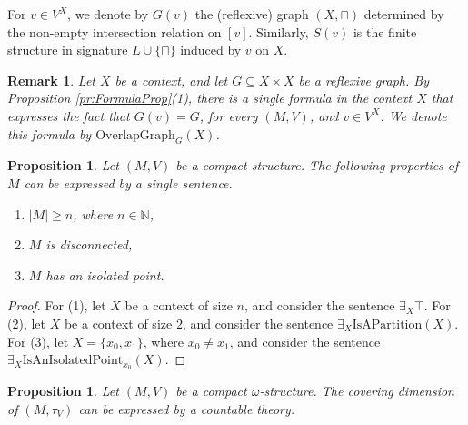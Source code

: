 \documentclass[12pt]{amsart}
\theoremstyle{plain}
\newtheorem{remark}[theorem]{\bf Remark}
\newtheorem{proposition}[theorem]{\bf Proposition}
\newcommand \NN{\mathbb{N}}
\newcommand \PPb{\mathbb{P}}
\DeclareMathOperator{\Cov}{\mathbf{Cov}}
\begin{document}
For $v \in V^X$, we denote by $G(v)$ the (reflexive) graph $(X, \sqcap)$ determined by the non-empty intersection relation on $[v]$. Similarly, $S(v)$ is the finite structure in signature $L \cup \{\sqcap\}$ induced by $v$ on $X$.
%
\begin{remark}
	Let $X$ be a context, and let $G \subseteq X \times X$ be a reflexive graph. By Proposition \ref{pr:FormulaProp}(1), there is a single formula in the context $X$ that expresses the fact that $G(v)=G$, for every $(M,V)$, and  $v \in V^X$. We denote this formula by $\mbox{OverlapGraph}_G(X)$. 
\end{remark}


\begin{proposition}
	\label{pr:BasicSentencesSpaces}
	Let $(M,V)$ be a compact structure. The following  properties of $M$ can be expressed by a single sentence.
	
	\begin{enumerate}
		\item $|M| \geq n$, where $n \in \NN$,
		\item $M$ is disconnected,
		\item $M$ has an isolated point.
	\end{enumerate}
\end{proposition}


\begin{proof}
	For (1),  let $X$ be a context of size $n$, and  consider the sentence $\exists_X \top$. For (2), let $X$ be a context of size $2$, and consider the sentence $\exists_X \text{IsAPartition}(X)$. For (3),  let $X=\{x_0,x_1\}$, where $x_0 \neq x_1$, and consider the sentence $\exists_X \text{IsAnIsolatedPoint}_{x_0}(X)$.
\end{proof}


\begin{proposition}
	Let $(M,V)$ be a compact $\omega$-structure. The covering dimension of $(M,\tau_V)$ can be expressed by a countable theory.
\end{proposition}

%
%
%
%
%
\end{document}
